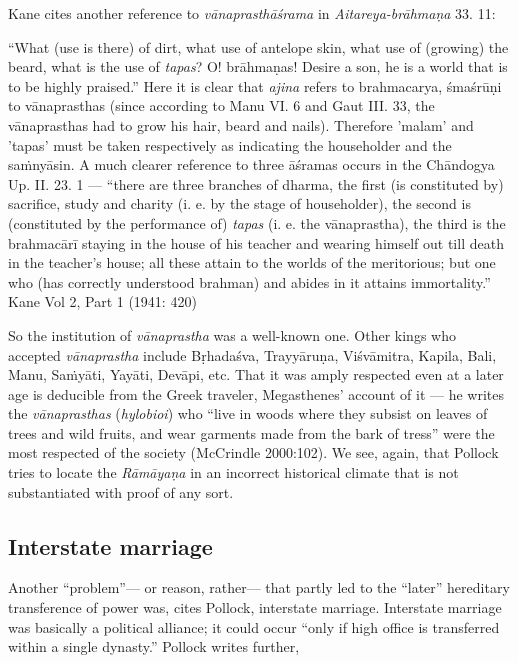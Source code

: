 Kane cites another reference to {\sl vānaprasthāśrama} in {\sl Aitareya-brāhmaṇa} 33. 11:

\begin{myquote}
“What (use is there) of dirt, what use of antelope skin, what use of (growing) the beard, what is the use of {\sl tapas}? O! brāhmaṇas! Desire a son, he is a world that is to be highly praised.” Here it is clear that {\sl ajina} refers to brahmacarya, śmaśrūṇi to vānaprasthas (since according to Manu VI. 6 and Gaut III. 33, the vānaprasthas had to grow his hair, beard and nails). Therefore 'malam’ and 'tapas' must be taken respectively as indicating the householder and the saṁnyāsin. A much clearer reference to three āśramas occurs in the Chāndogya Up. II. 23. 1 --- “there are three branches of dharma, the first (is constituted by) sacrifice, study and charity (i. e. by the stage of householder), the second is (constituted by the performance of) {\sl tapas} (i. e. the vānaprastha), the third is the brahmacārī staying in the house of his teacher and wearing himself out till death in the teacher's house; all these attain to the worlds of the meritorious; but one who (has correctly understood brahman) and abides in it attains immortality.”
\hfill Kane Vol 2, Part 1 (1941: 420)
\end{myquote}

So the institution of {\sl vānaprastha} was a well-known one. Other kings who accepted {\sl vānaprastha} include Bṛhadaśva, Trayyāruṇa, Viśvāmitra, Kapila, Bali, Manu, Saṁyāti, Yayāti, Devāpi, etc. That it was amply respected even at a later age is deducible from the Greek traveler, Megasthenes’ account of it --- he writes the {\sl vānaprasthas} ({\sl hylobioi}) who “live in woods where they subsist on leaves of trees and wild fruits, and wear garments made from the bark of tress” were the most respected of the society (McCrindle 2000:102).  We see, again, that Pollock tries to locate the {\sl Rāmāyaṇa} in an incorrect historical climate that is not substantiated with proof of any sort. 

\subsection{Interstate marriage}

Another “problem”--- or reason, rather--- that partly led to the “later” hereditary transference of power was, cites Pollock, interstate marriage. Interstate marriage was basically a political alliance; it could occur “only if high office is transferred within a single dynasty.” Pollock writes further, 


